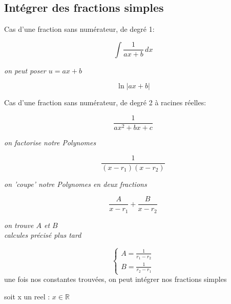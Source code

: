 \documentclass{article}
\newcommand{\smalltext}[1]{
    \scriptsize
    \textit{#1}
    \normalsize
}
\begin{document}
\subsection*{Intégrer des fractions simples}

Cas d'une fraction sans numérateur, de degré 1:
\begin{center}
\begin{equation*}
    \int \frac{1}{ax+b} \, dx
\end{equation*}
\smalltext{on peut poser $u = ax+b$}
\begin{equation*}
    \boxed{\ln |ax+b|}
\end{equation*}
\end{center}

\hrulefill

Cas d'une fraction sans numérateur, de degré 2 à racines réelles:
\begin{center}
\begin{equation*}
    \frac{1}{ax^2+bx+c}
\end{equation*}
\smalltext{on factorise notre Polynomes}
\begin{equation*}
    \frac{1}{(x-r_1)(x-r_2)}
\end{equation*}
\smalltext{on 'coupe' notre Polynomes en deux fractions}
\begin{equation*}
    \frac{A}{x-r_1} + \frac{B}{x-r_2}
\end{equation*}
\smalltext{on trouve $A$ et $B$} \\
\smalltext{calcules précisé plus tard}
\begin{equation*}
    \begin{cases}
        A = \frac{1}{r_1 - r_2} \\
        B = \frac{1}{r_2 - r_1}
    \end{cases}
\end{equation*}
une fois nos constantes trouvées, on peut intégrer nos fractions simples

\end{center}

\hrulefill

soit x un reel : $x \in \mathbb{R}$
\end{document}
